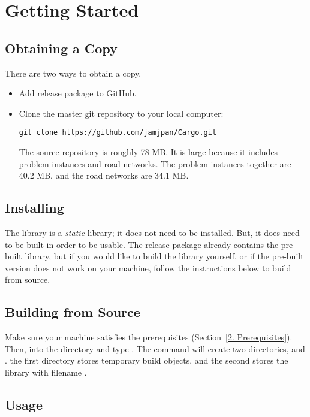 \section{Getting Started}

\subsection{Obtaining a Copy}

There are two ways to obtain a copy.
\begin{itemize}
    \item Add release package to GitHub.

    \item Clone the master  git repository to your local computer:
\begin{verbatim}
git clone https://github.com/jamjpan/Cargo.git
\end{verbatim}

The source repository is roughly 78 MB. It is large because it includes problem
instances and road networks. The problem instances together are 40.2 MB, and
the road networks are 34.1 MB.
\end{itemize}

\subsection{Installing}

The  library is a \emph{static} library; it does not need to be
installed. But, it does need to be built in order to be usable. The release
package already contains the pre-built library, but if you would like to build
the library yourself, or if the pre-built version does not work on your
machine, follow the instructions below to build from source.

\subsection{Building from Source}

Make sure your machine satisfies the prerequisites (Section~\ref{2.
Prerequisites}).  Then,  into the  directory and type
. The command will create two directories,  and
. the first directory stores temporary build objects, and the
second stores the library with filename .

\subsection{Usage}

